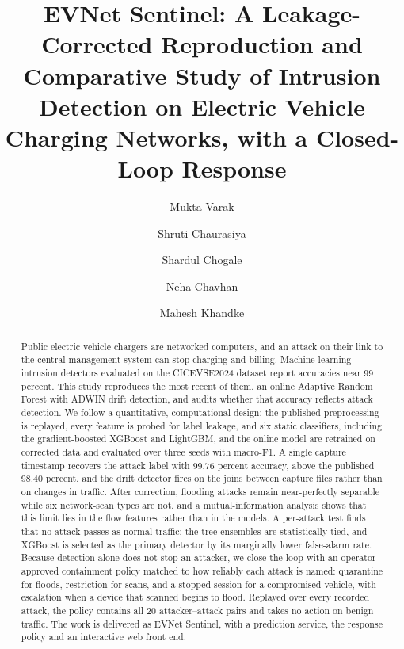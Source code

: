 \documentclass[preprint,12pt]{elsarticle}
\begin{document}
\begin{frontmatter}

\title{EVNet Sentinel: A Leakage-Corrected Reproduction and Comparative Study of Intrusion Detection on Electric Vehicle Charging Networks, with a Closed-Loop Response}

\author[vit]{Mukta Varak}
\author[vit]{Shruti Chaurasiya}
\author[vit]{Shardul Chogale}
\author[vit]{Neha Chavhan}
\author[vit]{Mahesh Khandke}


\begin{abstract}
Public electric vehicle chargers are networked computers, and an attack on their link to the central management system can stop charging and billing. Machine-learning intrusion detectors evaluated on the CICEVSE2024 dataset report accuracies near 99 percent. This study reproduces the most recent of them, an online Adaptive Random Forest with ADWIN drift detection, and audits whether that accuracy reflects attack detection. We follow a quantitative, computational design: the published preprocessing is replayed, every feature is probed for label leakage, and six static classifiers, including the gradient-boosted XGBoost and LightGBM, and the online model are retrained on corrected data and evaluated over three seeds with macro-F1. A single capture timestamp recovers the attack label with 99.76 percent accuracy, above the published 98.40 percent, and the drift detector fires on the joins between capture files rather than on changes in traffic. After correction, flooding attacks remain near-perfectly separable while six network-scan types are not, and a mutual-information analysis shows that this limit lies in the flow features rather than in the models. A per-attack test finds that no attack passes as normal traffic; the tree ensembles are statistically tied, and XGBoost is selected as the primary detector by its marginally lower false-alarm rate. Because detection alone does not stop an attacker, we close the loop with an operator-approved containment policy matched to how reliably each attack is named: quarantine for floods, restriction for scans, and a stopped session for a compromised vehicle, with escalation when a device that scanned begins to flood. Replayed over every recorded attack, the policy contains all 20 attacker--attack pairs and takes no action on benign traffic. The work is delivered as EVNet Sentinel, with a prediction service, the response policy and an interactive web front end.
\end{abstract}


\end{frontmatter}
\end{document}
